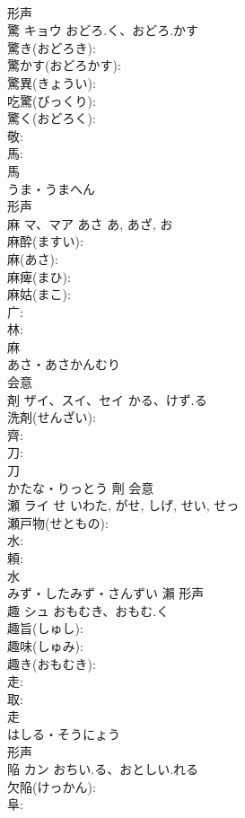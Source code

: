\documentclass[8pt]{extreport}
\begin{document}
\begin{CJK}{UTF8}{min}
\\	形声 
\\	驚	キョウ	おどろ.く、おどろ.かす		
\\	驚き(おどろき): 
\\	驚かす(おどろかす): 
\\	驚異(きょうい): 
\\	吃驚(びっくり): 
\\	驚く(おどろく): 
\\	敬: 
\\	馬: 
\\	馬	
\\	うま・うまへん	
\\	形声 
\\	麻	マ、マア	あさ	あ, あざ, お	
\\	麻酔(ますい): 
\\	麻(あさ): 
\\	麻痺(まひ): 
\\	麻姑(まこ): 
\\	广: 
\\	林: 
\\	麻	
\\	あさ・あさかんむり	
\\	会意 
\\	剤	ザイ、スイ、セイ	かる、けず.る		
\\	洗剤(せんざい): 
\\	齊: 
\\	刀: 
\\	刀	
\\	かたな・りっとう	劑	会意 
\\	瀬	ライ	せ	いわた, がせ, しげ, せい, せっ	
\\	瀬戸物(せともの): 
\\	水: 
\\	頼: 
\\	水	
\\	みず・したみず・さんずい	瀨	形声 
\\	趣	シュ	おもむき、おもむ.く		
\\	趣旨(しゅし): 
\\	趣味(しゅみ): 
\\	趣き(おもむき): 
\\	走: 
\\	取: 
\\	走	
\\	はしる・そうにょう	
\\	形声 
\\	陥	カン	おちい.る、おとしい.れる		
\\	欠陥(けっかん): 
\\	阜: 

\end{CJK}
\end{document}
